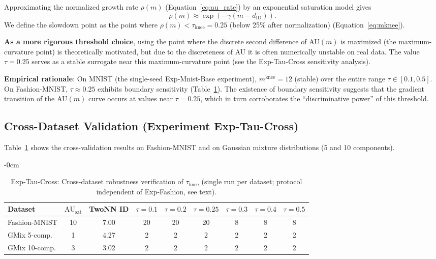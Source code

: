 \documentclass[make,article,submit,pdftex,moreauthors]{Definitions/mdpi}
\newcommand{\dID}{d_{\mathrm{ID}}}
\newcommand{\AUsat}{\mathrm{AU}_{\mathrm{sat}}}
\newcommand{\mknee}{m^{\mathrm{knee}}}
\begin{document}
Approximating the normalized growth rate $\rho(m)$
(Equation~\eqref{eq:au_rate}) by an exponential saturation model gives
\begin{equation}
  \rho(m) \approx \exp(-\gamma (m - \dID)).
  \label{eq:knee_curvature}
\end{equation}
We define the slowdown point as the point where
$\rho(m) < \tau_{\mathrm{knee}} = 0.25$ (below 25\% after normalization)
(Equation~\eqref{eq:mknee}).

\textbf{As a more rigorous threshold choice}, using the point where the discrete
second difference of AU$(m)$ is maximized (the maximum-curvature point) is
theoretically motivated, but due to the discreteness of AU it is often
numerically unstable on real data.
The value $\tau = 0.25$ serves as a stable surrogate near this maximum-curvature
point (see the Exp-Tau-Cross sensitivity analysis).

\textbf{Empirical rationale}:
On MNIST (the single-seed Exp-Mnist-Base experiment), $\mknee = 12$ (stable) over
the entire range $\tau \in [0.1, 0.5]$.
On Fashion-MNIST, $\tau \approx 0.25$ exhibits boundary sensitivity
(Table~\ref{tab:ez}).
The existence of boundary sensitivity suggests that the gradient transition of
the AU$(m)$ curve occurs at values near $\tau = 0.25$, which in turn corroborates
the ``discriminative power'' of this threshold.

\subsection*{Cross-Dataset Validation (Experiment Exp-Tau-Cross)}

Table~\ref{tab:ez} shows the cross-validation results on Fashion-MNIST and on
Gaussian mixture distributions (5 and 10 components).

\begin{table}[H]
\begin{adjustwidth}{-\extralength}{0cm}
\centering
\caption{Exp-Tau-Cross: Cross-dataset robustness verification of $\tau_{\mathrm{knee}}$ (single run per dataset; protocol independent of Exp-Fashion, see text).}
\label{tab:ez}
\small
\begin{tabular}{lcc|cccccc}
\toprule
Dataset & $\AUsat$ & TwoNN ID & $\tau=0.1$ & $\tau=0.2$ & $\tau=0.25$ & $\tau=0.3$ & $\tau=0.4$ & $\tau=0.5$ \\
\midrule
Fashion-MNIST & 10 & 7.00 & 20 & 20 & 20 & 8 & 8 & 8 \\
GMix 5-comp. & 1 & 4.27 & 2 & 2 & 2 & 2 & 2 & 2 \\
GMix 10-comp. & 3 & 3.02 & 2 & 2 & 2 & 2 & 2 & 2 \\
\bottomrule
\end{tabular}
\end{adjustwidth}
\end{table}
\end{document}
